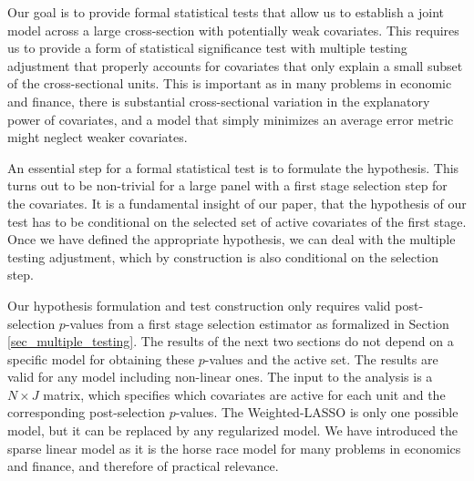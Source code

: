 \documentclass[11pt]{article}
\begin{document}
	
	
	Our goal is to provide formal statistical tests that allow us to establish a joint model across a large cross-section with potentially weak covariates. This requires us to provide a form of statistical significance test with multiple testing adjustment that properly accounts for covariates that only explain a small subset of the cross-sectional units. This is important as in many problems in economic and finance, there is substantial cross-sectional variation in the explanatory power of covariates, and a model that simply minimizes an average error metric might neglect weaker covariates.
	
	An essential step for a formal statistical test is to formulate the hypothesis. This turns out to be non-trivial for a large panel with a first stage selection step for the covariates. It is a fundamental insight of our paper, that the hypothesis of our test has to be conditional on the selected set of active covariates of the first stage. Once we have defined the appropriate hypothesis, we can deal with the multiple testing adjustment, which by construction is also conditional on the selection step. 
	
	Our hypothesis formulation and test construction only requires valid post-selection $p$-values from a first stage selection estimator as formalized in Section \ref{sec_multiple_testing}.
The results of the next two sections do not depend on a specific model for obtaining these $p$-values and the active set. The results are valid for any model including non-linear ones. The input to the analysis is a $N \times J$ matrix, which specifies which covariates are active for each unit and the corresponding post-selection $p$-values. The Weighted-LASSO is only one possible model, but it can be replaced by any regularized model. We have introduced the sparse linear model as it is the horse race model for many problems in economics and finance, and therefore of practical relevance.
\end{document}
